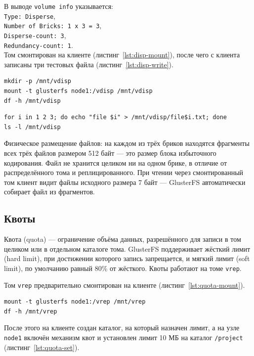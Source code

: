 В выводе \texttt{volume info} указывается:
\\\texttt{Type: Disperse},
\\\texttt{Number of Bricks: 1 x 3 = 3}, 
\\\texttt{Disperse-count: 3},
\\\texttt{Redundancy-count: 1}. 
\\Том смонтирован на клиенте
(листинг~\ref{lst:disp-mount}), после чего с клиента записаны
три тестовых файла (листинг~\ref{lst:disp-write}).

\begin{lstlisting}[caption={Монтирование тома на клиенте (mgmt)}, label={lst:disp-mount}]
mkdir -p /mnt/vdisp
mount -t glusterfs node1:/vdisp /mnt/vdisp
df -h /mnt/vdisp
\end{lstlisting}

\begin{lstlisting}[caption={Запись тестовых файлов (mgmt)}, label={lst:disp-write}]
for i in 1 2 3; do echo "file $i" > /mnt/vdisp/file$i.txt; done
ls -l /mnt/vdisp
\end{lstlisting}

Физическое размещение файлов: на каждом из трёх бриков
находятся фрагменты всех трёх файлов размером 512 байт ---
это размер блока избыточного кодирования. Файл не хранится
целиком ни на одном брике, в отличие от распределённого тома и реплицированного.
При чтении через смонтированный том
клиент видит файлы исходного размера 7 байт --- GlusterFS
автоматически собирает файл из фрагментов.

\subsection{Квоты}

Квота (quota) --- ограничение объёма данных, разрешённого для записи
в том целиком или в отдельном каталоге тома. GlusterFS поддерживает
жёсткий лимит (hard limit), при достижении которого запись
запрещается, и мягкий лимит (soft limit), по умолчанию равный
80\% от жёсткого. Квоты работают на томе \texttt{vrep}.

Том \texttt{vrep} предварительно смонтирован на клиенте
(листинг~\ref{lst:quota-mount}).

\begin{lstlisting}[caption={Монтирование тома vrep на клиенте (mgmt)}, label={lst:quota-mount}]
mount -t glusterfs node1:/vrep /mnt/vrep
df -h /mnt/vrep
\end{lstlisting}

После этого на клиенте создан каталог, на который назначен лимит,
а на узле \texttt{node1} включён механизм квот и установлен лимит
10 МБ на каталог \texttt{/project} (листинг~\ref{lst:quota-set}).

